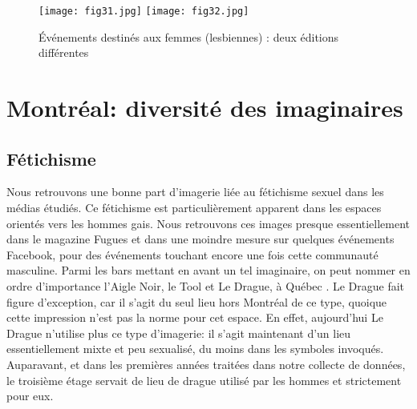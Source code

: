 \begin{figure}
\centering
{}
{\texttt{[image: fig31.jpg]}}
{\texttt{[image: fig32.jpg]}}
\caption{Événements destinés aux femmes (lesbiennes) : deux éditions
  différentes}\label{figs3132}
\end{figure}

\section{Montréal: diversité des imaginaires}
\label{sec:montr_al_diversit_des_imaginaires}

\subsection{Fétichisme}
Nous retrouvons une bonne part d'imagerie liée au fétichisme sexuel dans les médias étudiés. 
Ce fétichisme est particulièrement apparent dans les espaces orientés vers les hommes gais. 
Nous retrouvons ces images presque essentiellement dans le magazine Fugues et dans une moindre mesure sur quelques événements Facebook, pour des événements touchant encore une fois cette communauté masculine. 
Parmi les bars mettant en avant un tel imaginaire, on peut nommer en ordre d'importance l'Aigle Noir, le Tool et Le Drague, à Québec . 
Le Drague fait figure d'exception, car il s'agit du seul lieu hors Montréal de ce type, quoique cette impression n'est pas la norme pour cet espace. 
En effet, aujourd'hui Le Drague n'utilise plus ce type d'imagerie: il s'agit maintenant d'un lieu essentiellement mixte et peu sexualisé, du moins dans les symboles invoqués. 
Auparavant, et dans les premières années traitées dans notre collecte de données, le troisième étage servait de lieu de drague utilisé par les hommes et strictement pour eux. 

